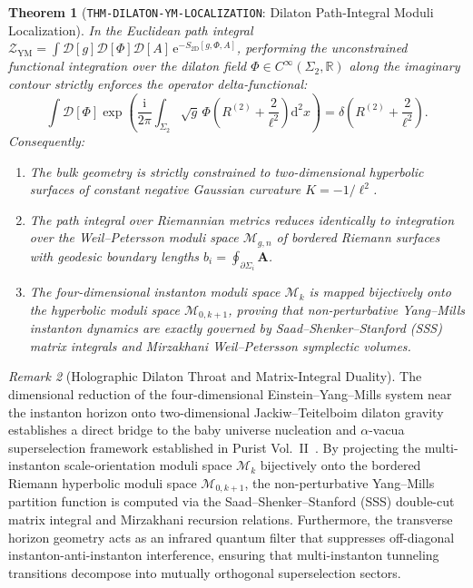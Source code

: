 \documentclass[11pt,a4paper,reqno]{article}
\theoremstyle{plain}
\newtheorem{theorem}{Theorem}[section]
\theoremstyle{definition}
\theoremstyle{remark}
\newtheorem{remark}[theorem]{Remark}
\numberwithin{equation}{section}
\providecommand{\diff}{\mathrm{d}}
\begin{document}
\begin{theorem}[\texttt{THM-DILATON-YM-LOCALIZATION}: Dilaton Path-Integral Moduli Localization]
\label{thm:dilaton_ym_localization}
In the Euclidean path integral $\mathcal{Z}_{\mathrm{YM}} = \int \mathcal{D}[g] \mathcal{D}[\Phi] \mathcal{D}[A] \, \mathrm{e}^{-S_{2\mathrm{D}}[g, \Phi, A]}$, performing the unconstrained functional integration over the dilaton field $\Phi \in C^\infty(\Sigma_2, \mathbb{R})$ along the imaginary contour strictly enforces the operator delta-functional:
\begin{equation}
  \int \mathcal{D}[\Phi] \exp\left( \frac{\mathrm{i}}{2\pi} \int_{\Sigma_2} \sqrt{g} \, \Phi \left( R^{(2)} + \frac{2}{\ell^2} \right) \diff^2 x \right) = \delta\left( R^{(2)} + \frac{2}{\ell^2} \right).
\end{equation}
Consequently:
\begin{enumerate}[label=\textbf{(\roman*)}, leftmargin=2.0em]
  \item The bulk geometry is strictly constrained to two-dimensional hyperbolic surfaces of constant negative Gaussian curvature $K = -1/\ell^2$.
  \item The path integral over Riemannian metrics reduces identically to integration over the Weil--Petersson moduli space $\mathcal{M}_{g,n}$ of bordered Riemann surfaces with geodesic boundary lengths $b_i = \oint_{\partial \Sigma_i} \mathbf{A}$.
  \item The four-dimensional instanton moduli space $\mathcal{M}_k$ is mapped bijectively onto the hyperbolic moduli space $\mathcal{M}_{0, k+1}$, proving that non-perturbative Yang--Mills instanton dynamics are exactly governed by Saad--Shenker--Stanford (SSS) matrix integrals and Mirzakhani Weil--Petersson symplectic volumes.
\end{enumerate}
\end{theorem}

\begin{remark}[Holographic Dilaton Throat and Matrix-Integral Duality]
\label{rem:holographic_dilaton_throat}
The dimensional reduction of the four-dimensional Einstein--Yang--Mills system near the instanton horizon onto two-dimensional Jackiw--Teitelboim dilaton gravity establishes a direct bridge to the baby universe nucleation and $\alpha$-vacua superselection framework established in Purist Vol.~II~\cite{PuristVol2Monograph2026}. By projecting the multi-instanton scale-orientation moduli space $\mathcal{M}_k$ bijectively onto the bordered Riemann hyperbolic moduli space $\mathcal{M}_{0, k+1}$, the non-perturbative Yang--Mills partition function is computed via the Saad--Shenker--Stanford (SSS) double-cut matrix integral and Mirzakhani recursion relations. Furthermore, the transverse horizon geometry acts as an infrared quantum filter that suppresses off-diagonal instanton-anti-instanton interference, ensuring that multi-instanton tunneling transitions decompose into mutually orthogonal superselection sectors.
\end{remark}
\end{document}
